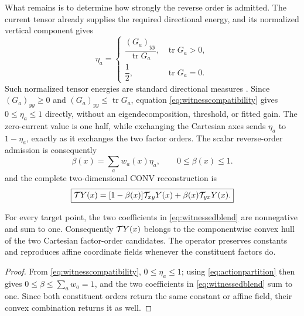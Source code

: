 What remains is to determine how strongly the reverse order is admitted.
The current tensor already supplies the required directional energy, and its
normalized vertical component gives
\begin{equation}
 \eta_a=
 \begin{cases}
 \dfrac{(G_a)_{yy}}{\operatorname{tr}G_a},&\operatorname{tr}G_a>0,\\[5pt]
 \dfrac12,&\operatorname{tr}G_a=0.
 \end{cases}
 \label{eq:witnesscompatibility}
\end{equation}
Such normalized tensor energies are standard directional measures
\cite{bigun1987}. Since \((G_a)_{yy}\geq0\) and
\((G_a)_{yy}\leq\operatorname{tr}G_a\), equation
\eqref{eq:witnesscompatibility} gives \(0\leq\eta_a\leq1\) directly, without
an eigendecomposition, threshold, or fitted gain. The zero-current value is
one half, while exchanging the Cartesian axes sends \(\eta_a\) to
\(1-\eta_a\), exactly as it exchanges the two factor orders. The scalar
reverse-order admission is consequently
\begin{equation}
 \beta(x)=\sum_aw_a(x)\eta_a,
 \qquad 0\leq\beta(x)\leq1.
 \label{eq:actionadmission}
\end{equation}
and the complete two-dimensional CONV reconstruction is
\begin{equation}
 \boxed{
 \mathcal{T} Y(x)=
 [1-\beta(x)]\mathcal{T}_{xy}Y(x)+\beta(x)\mathcal{T}_{yx}Y(x) .}
 \label{eq:witnessedblend}
\end{equation}

\begin{proposition}
For every target point, the two coefficients in
\eqref{eq:witnessedblend} are nonnegative and sum to one. Consequently
\(\mathcal{T} Y(x)\) belongs to the componentwise convex hull of the two Cartesian
factor-order candidates. The operator preserves constants and reproduces
affine coordinate fields whenever the constituent factors do.
\end{proposition}

\begin{proof}
From \eqref{eq:witnesscompatibility},
\(0\leq\eta_a\leq1\); using \eqref{eq:actionpartition} then gives
\(0\leq\beta\leq\sum_aw_a=1\), and the two coefficients in
\eqref{eq:witnessedblend} sum to one. Since both constituent orders return
the same constant or affine field, their convex combination returns it as
well.
\end{proof}

